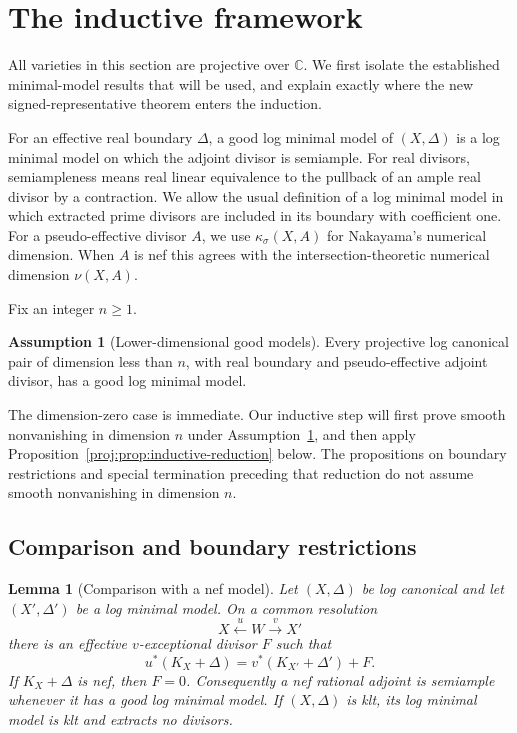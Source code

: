 \documentclass[11pt,letterpaper]{article}
\newtheorem{lemma}[theorem]{Lemma}
\theoremstyle{definition}
\newtheorem{assumption}[theorem]{Assumption}
\theoremstyle{remark}
\begin{document}
\section{The inductive framework}\label{proj:sec:induction}

All varieties in this section are projective over \(\mathbb{C}\).
We first isolate the established minimal-model results that will be
used, and explain exactly where the new signed-representative theorem
enters the induction.

For an effective real boundary \(\Delta\), a good log minimal model of
\((X,\Delta)\) is a log minimal model on which the adjoint divisor is
semiample. For real divisors, semiampleness means real linear equivalence
to the pullback of an ample real divisor by a contraction. We allow the
usual definition of a log minimal model in which extracted prime
divisors are included in its boundary with coefficient one.
For a pseudo-effective divisor \(A\), we use
\(\kappa_\sigma(X,A)\) for Nakayama's numerical dimension. When \(A\)
is nef this agrees with the intersection-theoretic numerical dimension
\(\nu(X,A)\).

Fix an integer \(n\geq 1\).
\begin{assumption}[Lower-dimensional good models]\label{proj:mmp:lower-models}
Every projective log canonical pair of dimension less than \(n\),
with real boundary and pseudo-effective adjoint divisor, has a good
log minimal model.
\end{assumption}

The dimension-zero case is immediate. Our inductive step will first
prove smooth nonvanishing in dimension \(n\) under
Assumption~\ref{proj:mmp:lower-models}, and then apply
Proposition~\ref{proj:prop:inductive-reduction} below.
The propositions on boundary restrictions and special termination
preceding that reduction do not assume smooth nonvanishing in
dimension \(n\).

\subsection{Comparison and boundary restrictions}

\begin{lemma}[Comparison with a nef model]\label{proj:mmp:comparison}
Let \((X,\Delta)\) be log canonical and let \((X',\Delta')\)
be a log minimal model. On a common resolution
\[
 X \xleftarrow{u} W \xrightarrow{v} X'
\]
there is an effective \(v\)-exceptional divisor \(F\) such that
\begin{equation}\label{proj:mmp:comparison-equation}
 u^*(K_X+\Delta)=v^*(K_{X'}+\Delta')+F.
\end{equation}
If \(K_X+\Delta\) is nef, then \(F=0\). Consequently a nef
rational adjoint is semiample whenever it has a good log minimal
model. If \((X,\Delta)\) is klt, its log minimal model is klt and
extracts no divisors.
\end{lemma}
\end{document}
